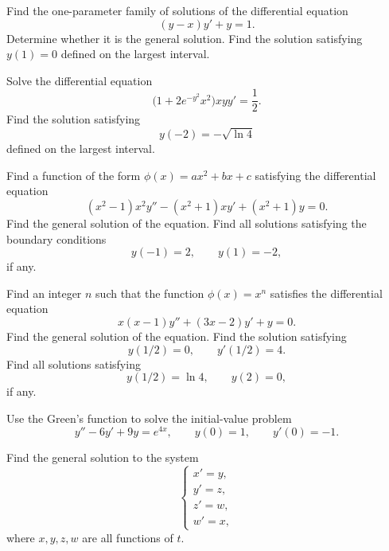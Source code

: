 \documentclass[11pt,oneside]{article}
\begin{document}
\begin{problem}
Find the one-parameter family of solutions of the differential equation
\[
(y-x)y'+y=1.
\]
Determine whether it is the general solution. Find the solution satisfying $y(1)=0$ defined on the largest interval.
\end{problem}

\begin{problem}
Solve the differential equation
\[
\bigl(1+2e^{-y^2}x^2\bigr)xyy'=\frac12.
\]
Find the solution satisfying
\[
y(-2)=-\sqrt{\ln 4}
\]
defined on the largest interval.
\end{problem}

\begin{problem}
Find a function of the form $\phi(x)=ax^2+bx+c$ satisfying the differential equation
\[
(x^2-1)x^2y''-(x^2+1)xy'+(x^2+1)y=0.
\]
Find the general solution of the equation. Find all solutions satisfying the boundary conditions
\[
y(-1)=2,
\qquad
y(1)=-2,
\]
if any.
\end{problem}

\begin{problem}
Find an integer $n$ such that the function $\phi(x)=x^n$ satisfies the differential equation
\[
x(x-1)y''+(3x-2)y'+y=0.
\]
Find the general solution of the equation. Find the solution satisfying
\[
y(1/2)=0,
\qquad
y'(1/2)=4.
\]
Find all solutions satisfying
\[
y(1/2)=\ln 4,
\qquad
y(2)=0,
\]
if any.
\end{problem}

\begin{problem}
Use the Green's function to solve the initial-value problem
\[
y''-6y'+9y=e^{4x},
\qquad
y(0)=1,
\qquad
y'(0)=-1.
\]
\end{problem}

\begin{problem}
Find the general solution to the system
\[
\begin{cases}
x'=y,\\
y'=z,\\
z'=w,\\
w'=x,
\end{cases}
\]
where $x,y,z,w$ are all functions of $t$.
\end{problem}
\end{document}

